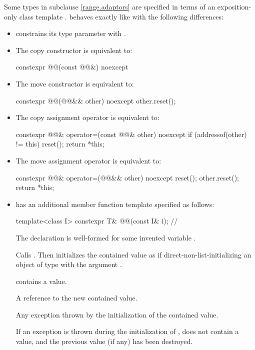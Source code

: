 \pnum
Some types in subclause \ref{range.adaptors} are specified in terms of
an exposition-only class template .
 behaves exactly like 
with the following differences:
\begin{itemize}
\item
{} constrains its type parameter 
with .
\item
The copy constructor is equivalent to:
\begin{codeblock}
constexpr @@(const @@&) noexcept { }
\end{codeblock}
\item
The move constructor is equivalent to:
\begin{codeblock}
constexpr @@(@@&& other) noexcept {
  other.reset();
}
\end{codeblock}
\item
The copy assignment operator is equivalent to:
\begin{codeblock}
constexpr @@& operator=(const @@& other) noexcept {
  if (addressof(other) != this)
    reset();
  return *this;
}
\end{codeblock}
\item
The move assignment operator is equivalent to:
\begin{codeblock}
constexpr @@& operator=(@@&& other) noexcept {
  reset();
  other.reset();
  return *this;
}
\end{codeblock}
\item
{} has an additional member function template
specified as follows:
\begin{itemdecl}
template<class I>
  constexpr T& @@(const I& i);    // \expos
\end{itemdecl}

\begin{itemdescr}
 \mandates
The declaration  is well-formed
for some invented variable .

 \effects
Calls .
Then initializes the contained value as if direct-non-list-initializing
an object of type  with the argument .

 \ensures
{} contains a value.

 \returns
A reference to the new contained value.

 \throws
Any exception thrown by the initialization of the contained value.

 \remarks
If an exception is thrown during the initialization of ,
 does not contain a value, and
the previous value (if any) has been destroyed.
\end{itemdescr}
\end{itemize}

